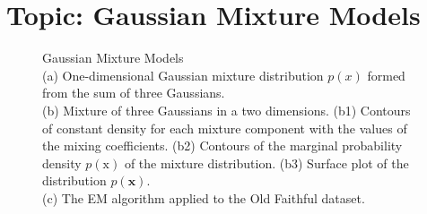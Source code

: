 \documentclass[11pt]{article}
\theoremstyle{plain} %
\theoremstyle{remark}
\begin{document}
\begin{center}

  {}
\end{center}
\vspace{2em}

\tableofcontents

\section{Topic: Gaussian Mixture Models}

\begin{figure}[!htp]
  \begin{center}
    \caption{Gaussian Mixture Models\\
    (a) One-dimensional Gaussian mixture distribution $p(x)$ formed
    from the sum of three Gaussians.\\
    (b) Mixture of three Gaussians in a two
    dimensions. (b1) Contours of constant density for each mixture component
    with the values of the mixing coefficients. (b2) Contours of the marginal
    probability density $p(\mathrm{x})$ of the mixture distribution. (b3)
    Surface plot of the distribution $p(\mathbf{x})$. \\
    (c) The EM algorithm applied to the Old Faithful dataset.}
    \label{fig: 3-mixture of Gaussians}
  \end{center}
\end{figure}
\end{document}
